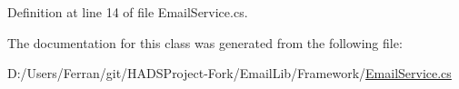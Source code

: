 Definition at line 14 of file Email\+Service.\+cs.



The documentation for this class was generated from the following file\+:\begin{DoxyCompactItemize}
\item 
D\+:/\+Users/\+Ferran/git/\+H\+A\+D\+S\+Project-\/\+Fork/\+Email\+Lib/\+Framework/\mbox{\hyperlink{EmailService_8cs}{Email\+Service.\+cs}}\end{DoxyCompactItemize}

